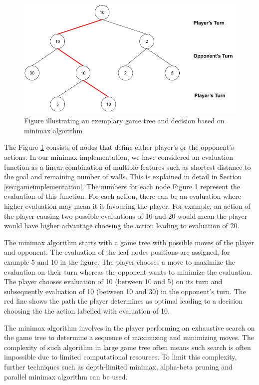 \begin{figure}
    \centering
    \includegraphics[width=\linewidth]{../img/Minimax1.png}
    \caption{Figure illustrating an exemplary game tree and decision based on minimax algorithm}
    \label{fig:minimax1}
\end{figure}

The Figure \ref{fig:minimax1} consists of nodes that define either player's or the opponent's actions. In our minimax implementation, we have considered an evaluation function as a linear combination of multiple features such as shortest distance to the goal and remaining number of walls. This is explained in detail in Section \ref{sec:gameimplementation}. The numbers for each node Figure \ref{fig:minimax1} represent the evaluation of this function. For each action, there can be an evaluation where higher evaluation may mean it is favouring the player. For example, an action of the player causing two possible evaluations of 10 and 20 would mean the player would have higher advantage choosing the action leading to evaluation of 20. 

The minimax algorithm starts with a game tree with possible moves of the player and opponent. The evaluation of the leaf nodes positions are assigned, for example 5 and 10 in the figure. The player chooses a move to maximize the evaluation on their turn whereas the opponent wants to minimize the evaluation. The player chooses evaluation of 10 (between 10 and 5) on its turn and subsequently evaluation of 10 (between 10 and 30) in the opponent's turn. The red line shows the path the player determines as optimal leading to a decision choosing the the action labelled with evaluation of 10.

The minimax algorithm involves in the player performing an exhaustive search on the game tree to determine a sequence of maximizing and minimizing moves. The complexity of such algorithm in large game tree often means such search is often impossible due to limited computational resources. To limit this complexity, further techniques such as depth-limited minimax, alpha-beta pruning and parallel minimax algorithm can be used.

